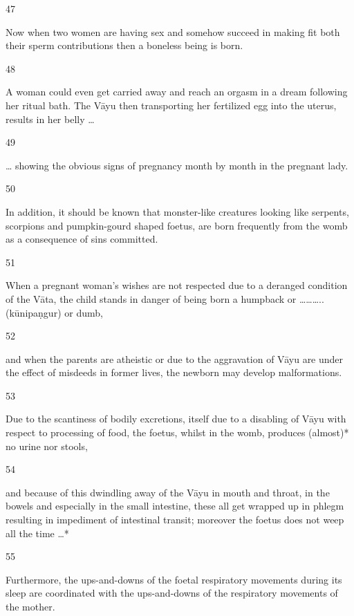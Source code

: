 \begin{translation}
\begin{tt}
\item[47]

 Now when two women are having sex and somehow succeed in making 
  fit both their sperm contributions then a boneless being is born.
  
\item[48]

A woman could even get carried away and reach an orgasm in a dream 
  following her ritual bath. The Vāyu then transporting her fertilized egg into the 
  uterus, results in her belly …
  
\item[49]

 … showing the obvious signs of pregnancy month by month in the 
  pregnant lady.
  
\item[50]

In addition, it should be known that monster-like creatures looking like 
  serpents, scorpions and pumpkin-gourd shaped foetus, are born frequently from 
  the womb as a consequence of sins committed.
  
\item[51]

When a pregnant woman’s wishes are not respected due to a deranged 
  condition of the Vāta, the child stands in danger of being born a humpback or 
  ……….. (kūnipaṇgur) or dumb,
  
\item[52]

and when the parents are atheistic or due to the aggravation of Vāyu are 
  under the effect of misdeeds in former lives, the newborn may develop 
  malformations.
  
\item[53]

 Due to the scantiness of bodily excretions, itself due to a disabling of 
  Vāyu with respect to processing of food, the foetus, whilst in the womb, 
  produces (almost)* no urine nor stools, 
  
\item[54]

 and because of this dwindling away of the Vāyu in mouth and throat, in 
  the bowels and especially in the small intestine, these all get wrapped up in 
  phlegm resulting in impediment of intestinal transit; moreover the foetus does 
  not weep all the time …*
  
\item[55]

Furthermore, the ups-and-downs of the foetal respiratory movements 
  during its sleep are coordinated with the ups-and-downs of the respiratory 
  movements of the mother.
  

\end{tt}
\end{translation}
